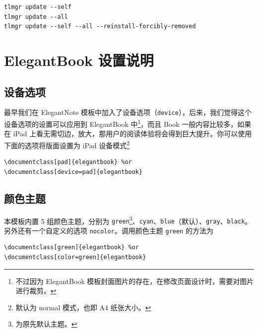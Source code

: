 \documentclass[lang=cn,newtx,10pt,scheme=chinese,pad,twocol]{zznote}
\begin{document}
\begin{lstlisting}
tlmgr update --self 
tlmgr update --all
tlmgr update --self --all --reinstall-forcibly-removed
\end{lstlisting}






\chapter{ElegantBook 设置说明}

\section{设备选项}
最早我们在 ElegantNote 模板中加入了设备选项（\lstinline{device}），后来，我们觉得这个设备选项的设置可以应用到 ElegantBook 中\footnote{不过因为 ElegantBook 模板封面图片的存在，在修改页面设计时，需要对图片进行裁剪。}，而且 Book 一般内容比较多，如果在 iPad 上看无需切边，放大，那用户的阅读体验将会得到巨大提升。你可以使用下面的选项将版面设置为 iPad 设备模式\footnote{默认为 normal 模式，也即 A4 纸张大小。}
\begin{lstlisting}
\documentclass[pad]{elegantbook} %or
\documentclass[device=pad]{elegantbook}
\end{lstlisting}

\section{颜色主题}

本模板内置 5 组颜色主题，分别为 \textcolor{structure1}{\lstinline{green}}\footnote{为原先默认主题。}、\textcolor{structure2}{\lstinline{cyan}}、\textcolor{structure3}{\lstinline{blue}}（默认）、\textcolor{structure4}{\lstinline{gray}}、\textcolor{structure5}{\lstinline{black}}。另外还有一个自定义的选项  \lstinline{nocolor}。调用颜色主题 \lstinline{green} 的方法为
\begin{lstlisting}
\documentclass[green]{elegantbook} %or
\documentclass[color=green]{elegantbook}
\end{lstlisting}
\end{document}
